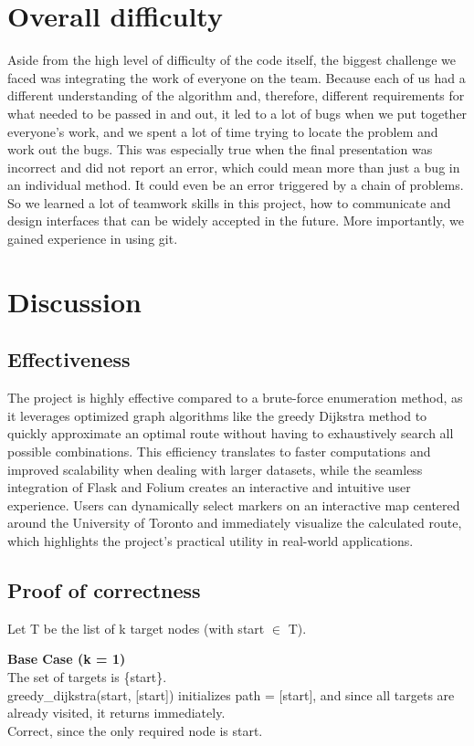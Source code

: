 \documentclass[12pt]{article}
\begin{document}
	\section*{Overall difficulty}
	Aside from the high level of difficulty of the code itself, the biggest challenge we faced was integrating the work of everyone on the team. Because each of us had a different understanding of the algorithm and, therefore, different requirements for what needed to be passed in and out, it led to a lot of bugs when we put together everyone's work, and we spent a lot of time trying to locate the problem and work out the bugs. This was especially true when the final presentation was incorrect and did not report an error, which could mean more than just a bug in an individual method. It could even be an error triggered by a chain of problems.
	So we learned a lot of teamwork skills in this project, how to communicate and design interfaces that can be widely accepted in the future. More importantly, we gained experience in using git.
	
	\section*{Discussion}
	\subsection*{Effectiveness}
	The project is highly effective compared to a brute-force enumeration method, as it leverages optimized graph algorithms like the greedy Dijkstra method to quickly approximate an optimal route without having to exhaustively search all possible combinations. This efficiency translates to faster computations and improved scalability when dealing with larger datasets, while the seamless integration of Flask and Folium creates an interactive and intuitive user experience. Users can dynamically select markers on an interactive map centered around the University of Toronto and immediately visualize the calculated route, which highlights the project’s practical utility in real-world applications.
	
	\subsection*{Proof of correctness}
	Let T be the list of k target nodes (with start $\in$ T).
	
	\textbf{Base Case (k = 1)}\\
	The set of targets is \{start\}.
	\\greedy\_dijkstra(start, [start]) initializes path = [start], and since all targets are already visited, it returns immediately.\\
	Correct, since the only required node is start.
	
\end{document}
